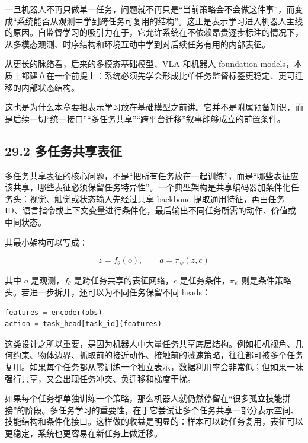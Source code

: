一旦机器人不再只做单一任务，问题就不再只是“当前策略会不会做这件事”，而变成“系统能否从观测中学到跨任务可复用的结构”。这正是表示学习进入机器人主线的原因。自监督学习的吸引力在于，它允许系统在不依赖昂贵逐步标注的情况下，从多模态观测、时序结构和环境互动中学到对后续任务有用的内部表征。

从更长的脉络看，后来的多模态基础模型、VLA 和机器人 foundation models，本质上都建立在一个前提上：系统必须先学会形成比单任务监督标签更稳定、更可迁移的内部状态结构。

这也是为什么本章要把表示学习放在基础模型之前讲。它并不是附属预备知识，而是后续一切“统一接口”“多任务共享”“跨平台迁移”叙事能够成立的前置条件。

\subsection*{29.2 多任务共享表征}


多任务共享表征的核心问题，不是“把所有任务放在一起训练”，而是“哪些表征应该共享，哪些表征必须保留任务特异性”。一个典型架构是共享编码器加条件化任务头：视觉、触觉或状态输入先经过共享 backbone 提取通用特征，再由任务 ID、语言指令或上下文变量进行条件化，最后输出不同任务所需的动作、价值或中间状态。

其最小架构可以写成：

\begin{equation*}
z = f_\theta(o), \qquad a = \pi_\psi(z, c)
\end{equation*}

其中 \(o\) 是观测，\(f_\theta\) 是跨任务共享的表征网络，\(c\) 是任务条件，\(\pi_\psi\) 则是条件策略头。若进一步拆开，还可以为不同任务保留不同 heads：

\begin{lstlisting}[language=python]
features = encoder(obs)
action = task_head[task_id](features)
\end{lstlisting}

这类设计之所以重要，是因为机器人中大量任务共享底层结构。例如相机视角、几何约束、物体边界、抓取前的接近动作、接触前的减速策略，往往都可被多个任务复用。如果每个任务都从零训练一个独立表示，数据利用率会非常低；但如果一味强行共享，又会出现任务冲突、负迁移和梯度干扰。

如果每个任务都单独训练一个策略，那么机器人就仍然停留在“很多孤立技能拼接”的阶段。多任务学习的重要性，在于它尝试让多个任务共享一部分表示空间、技能结构和条件化接口。这样做的收益是明显的：样本可以跨任务复用，表征可以更稳定，系统也更容易在新任务上做迁移。

